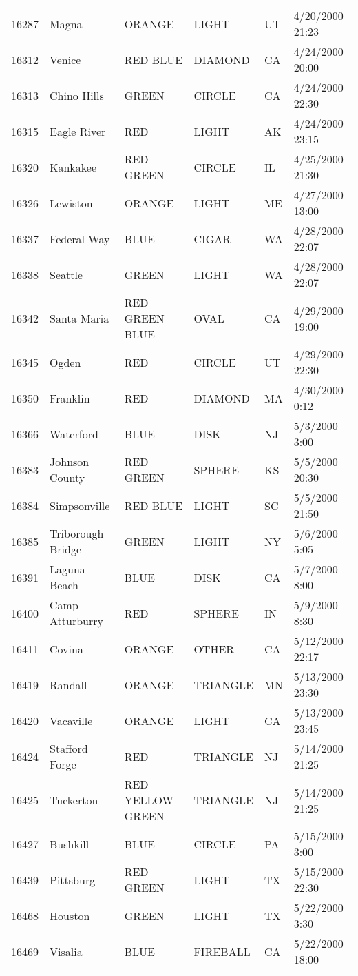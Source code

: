 \begin{tabular}{llllll}
16287 & Magna & ORANGE & LIGHT & UT & 4/20/2000 21:23 \\
16312 & Venice & RED BLUE & DIAMOND & CA & 4/24/2000 20:00 \\
16313 & Chino Hills & GREEN & CIRCLE & CA & 4/24/2000 22:30 \\
16315 & Eagle River & RED & LIGHT & AK & 4/24/2000 23:15 \\
16320 & Kankakee & RED GREEN & CIRCLE & IL & 4/25/2000 21:30 \\
16326 & Lewiston & ORANGE & LIGHT & ME & 4/27/2000 13:00 \\
16337 & Federal Way & BLUE & CIGAR & WA & 4/28/2000 22:07 \\
16338 & Seattle & GREEN & LIGHT & WA & 4/28/2000 22:07 \\
16342 & Santa Maria & RED GREEN BLUE & OVAL & CA & 4/29/2000 19:00 \\
16345 & Ogden & RED & CIRCLE & UT & 4/29/2000 22:30 \\
16350 & Franklin & RED & DIAMOND & MA & 4/30/2000 0:12 \\
16366 & Waterford & BLUE & DISK & NJ & 5/3/2000 3:00 \\
16383 & Johnson County & RED GREEN & SPHERE & KS & 5/5/2000 20:30 \\
16384 & Simpsonville & RED BLUE & LIGHT & SC & 5/5/2000 21:50 \\
16385 & Triborough Bridge & GREEN & LIGHT & NY & 5/6/2000 5:05 \\
16391 & Laguna Beach & BLUE & DISK & CA & 5/7/2000 8:00 \\
16400 & Camp Atturburry & RED & SPHERE & IN & 5/9/2000 8:30 \\
16411 & Covina & ORANGE & OTHER & CA & 5/12/2000 22:17 \\
16419 & Randall & ORANGE & TRIANGLE & MN & 5/13/2000 23:30 \\
16420 & Vacaville & ORANGE & LIGHT & CA & 5/13/2000 23:45 \\
16424 & Stafford Forge & RED & TRIANGLE & NJ & 5/14/2000 21:25 \\
16425 & Tuckerton & RED YELLOW GREEN & TRIANGLE & NJ & 5/14/2000 21:25 \\
16427 & Bushkill & BLUE & CIRCLE & PA & 5/15/2000 3:00 \\
16439 & Pittsburg & RED GREEN & LIGHT & TX & 5/15/2000 22:30 \\
16468 & Houston & GREEN & LIGHT & TX & 5/22/2000 3:30 \\
16469 & Visalia & BLUE & FIREBALL & CA & 5/22/2000 18:00 \\

\end{tabular}

